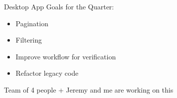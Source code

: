 



\begin{frame}{Desktop App}
    Goals for the Quarter:
    \begin{itemize}
        \item Pagination
        \item Filtering
        \item Improve workflow for verification
        \item Refactor legacy code
    \end{itemize} 
    Team of 4 people + Jeremy and me are working on this
\end{frame}


